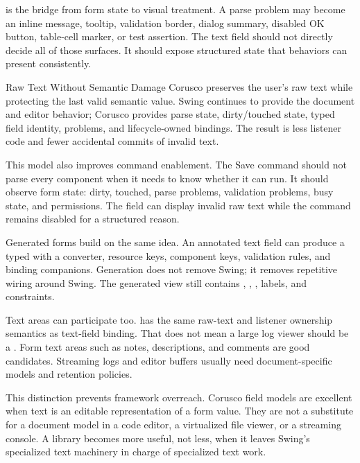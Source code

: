 is the bridge from form state to visual treatment. A parse problem may become an inline message, tooltip, validation border, dialog summary, disabled OK button, table-cell marker, or test assertion. The text field should not directly decide all of those surfaces. It should expose structured state that behaviors can present consistently.

\begin{coruscobox}{Raw Text Without Semantic Damage}
Corusco  preserves the user's raw text while protecting the last valid semantic value. Swing continues to provide the document and editor behavior; Corusco provides parse state, dirty/touched state, typed field identity, problems, and lifecycle-owned bindings. The result is less listener code and fewer accidental commits of invalid text.
\end{coruscobox}

This model also improves command enablement. The Save command should not parse every component when it needs to know whether it can run. It should observe form state: dirty, touched, parse problems, validation problems, busy state, and permissions. The field can display invalid raw text while the command remains disabled for a structured reason.

Generated forms build on the same idea. An annotated text field can produce a typed  with a converter, resource keys, component keys, validation rules, and binding companions. Generation does not remove Swing; it removes repetitive wiring around Swing. The generated view still contains , , , labels, and \miglayout{} constraints.

Text areas can participate too.  has the same raw-text and listener ownership semantics as text-field binding. That does not mean a large log viewer should be a . Form text areas such as notes, descriptions, and comments are good candidates. Streaming logs and editor buffers usually need document-specific models and retention policies.

This distinction prevents framework overreach. Corusco field models are excellent when text is an editable representation of a form value. They are not a substitute for a document model in a code editor, a virtualized file viewer, or a streaming console. A library becomes more useful, not less, when it leaves Swing's specialized text machinery in charge of specialized text work.

